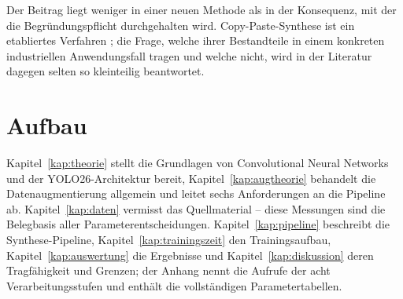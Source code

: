 Der Beitrag liegt weniger in einer neuen Methode als in der Konsequenz, mit der
die Begründungspflicht durchgehalten wird. Copy-Paste-Synthese ist ein
etabliertes Verfahren \parencite{dwibedi2017,dvornik2018,ghiasi2021}; die Frage,
welche ihrer Bestandteile in einem konkreten industriellen Anwendungsfall tragen
und welche nicht, wird in der Literatur dagegen selten so kleinteilig
beantwortet.

\section{Aufbau}

Kapitel~\ref{kap:theorie} stellt die Grundlagen von Convolutional Neural Networks
und der YOLO26-Architektur bereit, Kapitel~\ref{kap:augtheorie} behandelt die
Datenaugmentierung allgemein und leitet sechs Anforderungen an die Pipeline ab.
Kapitel~\ref{kap:daten} vermisst das Quellmaterial -- diese Messungen sind die
Belegbasis aller Parameterentscheidungen. Kapitel~\ref{kap:pipeline} beschreibt
die Synthese-Pipeline, Kapitel~\ref{kap:trainingszeit} den Trainingsaufbau,
Kapitel~\ref{kap:auswertung} die Ergebnisse und Kapitel~\ref{kap:diskussion}
deren Tragfähigkeit und Grenzen; der Anhang nennt die Aufrufe der acht
Verarbeitungsstufen und enthält die vollständigen Parametertabellen.
